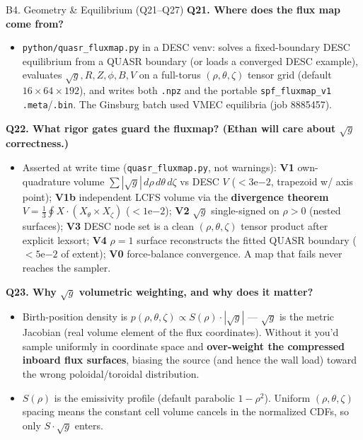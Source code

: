 \documentclass[11pt,aspectratio=169]{beamer}
\newcommand{\qitem}[1]{\medskip\textbf{#1}\par}
\begin{document}
\begin{frame}[allowframebreaks]{B4. Geometry \& Equilibrium (Q21--Q27)}
\small
\qitem{Q21. Where does the flux map come from?}
\begin{itemize}
\item \texttt{python/quasr\_fluxmap.py} in a DESC venv: solves a fixed-boundary DESC
      equilibrium from a QUASR boundary (or loads a converged DESC example), evaluates
      $\sqrt{g}, R, Z, \phi, B, V$ on a full-torus $(\rho,\theta,\zeta)$ tensor grid (default
      $16 \times 64 \times 192$), and writes both \texttt{.npz} and the portable
      \texttt{spf\_fluxmap\_v1} \texttt{.meta}/\texttt{.bin}. The Ginsburg batch used VMEC
      equilibria (job 8885457).
\end{itemize}

\qitem{Q22. What rigor gates guard the fluxmap? (Ethan will care about $\sqrt{g}$ correctness.)}
\begin{itemize}
\item Asserted at write time (\texttt{quasr\_fluxmap.py}, not warnings):
      \textbf{V1} own-quadrature volume $\sum|\sqrt{g}|\, d\rho\, d\theta\, d\zeta$ vs DESC $V$
      ($< 3\mathrm{e}{-2}$, trapezoid w/ axis point);
      \textbf{V1b} independent LCFS volume via the \textbf{divergence theorem}
      $V = \tfrac13\oint X \cdot (X_\theta \times X_\zeta)$ ($< 1\mathrm{e}{-2}$);
      \textbf{V2} $\sqrt{g}$ single-signed on $\rho > 0$ (nested surfaces);
      \textbf{V3} DESC node set is a clean $(\rho,\theta,\zeta)$ tensor product after explicit
      lexsort; \textbf{V4} $\rho = 1$ surface reconstructs the fitted QUASR boundary
      ($< 5\mathrm{e}{-2}$ of extent); \textbf{V0} force-balance convergence. A map that fails
      never reaches the sampler.
\end{itemize}

\framebreak
\qitem{Q23. Why $\sqrt{g}$ volumetric weighting, and why does it matter?}
\begin{itemize}
\item Birth-position density is $p(\rho,\theta,\zeta) \propto S(\rho)\cdot|\sqrt{g}|$ ---
      $\sqrt{g}$ is the metric Jacobian (real volume element of the flux coordinates). Without
      it you'd sample uniformly in coordinate space and \textbf{over-weight the compressed
      inboard flux surfaces}, biasing the source (and hence the wall load) toward the wrong
      poloidal/toroidal distribution.
\item $S(\rho)$ is the emissivity profile (default parabolic $1 - \rho^2$). Uniform
      $(\rho,\theta,\zeta)$ spacing means the constant cell volume cancels in the normalized
      CDFs, so only $S\cdot\sqrt{g}$ enters.
\end{itemize}


\end{frame}
\end{document}
